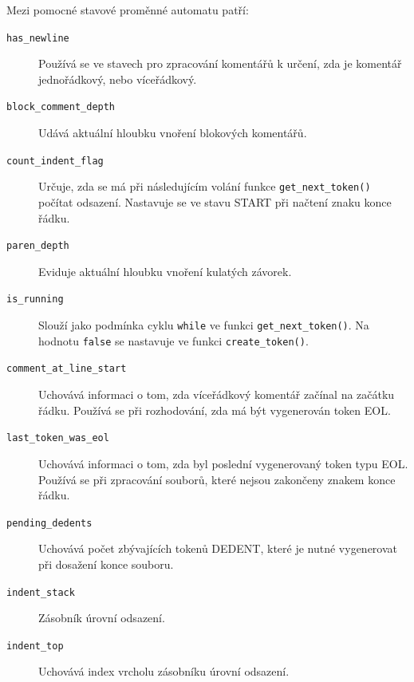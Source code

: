 \documentclass[a4paper, 12pt]{article}
\begin{document}
Mezi pomocné stavové proměnné automatu patří:

\begin{description}
    \item[\texttt{has\_newline}]
    Používá se ve stavech pro zpracování komentářů
    k určení, zda je komentář jednořádkový, nebo víceřádkový.

    \item[\texttt{block\_comment\_depth}]
    Udává aktuální hloubku vnoření blokových komentářů.

    \item[\texttt{count\_indent\_flag}]
    Určuje, zda se má při následujícím volání funkce
    \texttt{get\_next\_token()} počítat odsazení.
    Nastavuje se ve stavu START při načtení znaku
    konce řádku.

    \item[\texttt{paren\_depth}]
    Eviduje aktuální hloubku vnoření kulatých závorek.

    \item[\texttt{is\_running}]
    Slouží jako podmínka cyklu \texttt{while} ve funkci
    \texttt{get\_next\_token()}. Na hodnotu \texttt{false}
    se nastavuje ve funkci \texttt{create\_token()}.

    \item[\texttt{comment\_at\_line\_start}]
    Uchovává informaci o tom, zda víceřádkový komentář
    začínal na začátku řádku. Používá se při rozhodování,
    zda má být vygenerován token EOL.

    \item[\texttt{last\_token\_was\_eol}]
    Uchovává informaci o tom, zda byl poslední vygenerovaný
    token typu EOL. Používá se při zpracování souborů,
    které nejsou zakončeny znakem konce řádku.

    \item[\texttt{pending\_dedents}]
    Uchovává počet zbývajících tokenů DEDENT, které je
    nutné vygenerovat při dosažení konce souboru.


    \item[\texttt{indent\_stack}]
    Zásobník úrovní odsazení.

    \item[\texttt{indent\_top}]
    Uchovává index vrcholu zásobníku úrovní odsazení.
    
\end{description}

\clearpage
\begingroup

\setlength{\paperwidth}{297mm}
\setlength{\paperheight}{420mm}
\setlength{\pdfpagewidth}{297mm}
\setlength{\pdfpageheight}{420mm}
\end{document}
